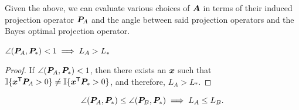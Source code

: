 \documentclass[10pt]{article}
\begin{document}
Given the above, we can evaluate various choices of $\boldsymbol{A}$ in terms of their induced projection operator $\boldsymbol{P}_A$ and the angle between said projection operators and the Bayes optimal projection operator.


\begin{lem}
$\angle(\boldsymbol{P}_A, \boldsymbol{P}_*) <1  \implies L_A > L_*$
\end{lem}


\begin{proof}
If $\angle(\boldsymbol{P}_A, \boldsymbol{P}_*) <1$, then there exists an $\boldsymbol{x}$ such that $\mathbb{I}\{ \boldsymbol{x}^{\mathsf{T}} \boldsymbol{P}_A >0 \} \neq \mathbb{I}\{ \boldsymbol{x}^{\mathsf{T}} \boldsymbol{P}_* >0 \}$, and therefore, $L_A > L_*$.
\end{proof}



\begin{lem}
\label{q:a2}
$$\angle(\boldsymbol{P}_A,\boldsymbol{P}_*) \leq \angle(\boldsymbol{P}_B,\boldsymbol{P}_*) \implies L_A \leq L_B.$$
\end{lem}
\end{document}
